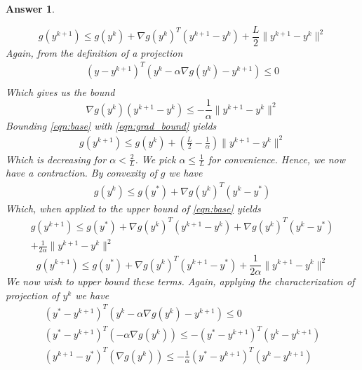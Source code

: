 \documentclass[12pt]{article}
\theoremstyle{colon}
\newtheorem*{answer}{Answer}
\begin{document}
\begin{answer}
\begin{enumerate}[label=\arabic*)]
      \begin{equation}\label{eqn:base}
        g(y^{k+1}) \leq g(y^k) + \nabla g(y^k)^T (y^{k+1} - y^k) + \frac{L}{2} \lVert y^{k+1} - y^k \rVert^2
      \end{equation}
      Again, from the definition of a projection
      \begin{gather*}
        (y - y^{k+1})^T (y^k - \alpha \nabla g(y^k) - y^{k+1}) \leq 0 \\
      \end{gather*}
      Which gives us the bound
      \begin{equation}\label{eqn:grad_bound}
        \nabla g(y^k)(y^{k+1} - y^k) \leq -\frac{1}{\alpha} \lVert y^{k+1} - y^k \rVert^2
      \end{equation}
      Bounding \eqref{eqn:base} with \eqref{eqn:grad_bound} yields
      \begin{gather*}
        g(y^{k+1}) \leq g(y^k) + (\frac{L}{2} - \frac{1}{\alpha}) \lVert y^{k+1} - y^k \rVert^2
      \end{gather*}
      Which is decreasing for $\alpha < \frac{2}{L}$. We pick $\alpha \leq \frac{1}{L}$ for convenience. Hence, we now have a contraction. By convexity of $g$ we have
      \begin{gather*}
        g(y^k) \leq g(y^*) + \nabla g(y^k)^T (y^k -y^*)
      \end{gather*}
      Which, when applied to the upper bound of \eqref{eqn:base} yields
      \begin{gather*}
        g(y^{k+1}) \leq g(y^*) + \nabla g(y^k)^T (y^{k+1} - y^k) + \nabla g(y^k)^T (y^k - y^*) \\
        + \frac{1}{2 \alpha} \lVert y^{k+1} - y^k \rVert^2
      \end{gather*}
      \begin{equation}\label{eqn:new_base}
        g(y^{k+1}) \leq g(y^*) + \nabla g(y^k)^T (y^{k+1} - y^*)+ \frac{1}{2 \alpha} \lVert y^{k+1} - y^k \rVert^2
      \end{equation}
      We now wish to upper bound these terms. Again, applying the characterization of projection of $y^k$ we have
      \begin{gather*}
        (y^* - y^{k+1})^T (y^k - \alpha \nabla g(y^k) - y^{k+1}) \leq 0 \\
        (y^* - y^{k+1})^T (- \alpha \nabla g(y^k)) \leq - (y^* - y^{k+1})^T (y^k - y^{k+1}) \\
        (y^{k+1} - y^*)^T (\nabla g(y^k)) \leq -\frac{1}{\alpha}(y^* - y^{k+1})^T (y^k - y^{k+1}) \\

\end{gather*}
\end{enumerate}
\end{answer}
\end{document}

